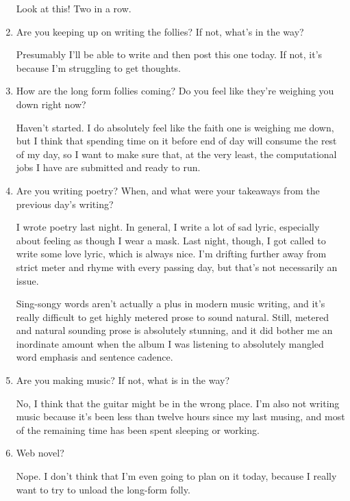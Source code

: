 \documentclass[12pt]{article}
\renewcommand{\,}{\textsuperscript{,}}
\begin{document}
\begin{enumerate}
Look at this! Two in a row.

\item Are you keeping up on writing the follies? If not, what's in the way?

Presumably I'll be able to write and then post this one today. If not, it's because I'm struggling to get thoughts.

\item How are the long form follies coming? Do you feel like they're weighing you down right now?

Haven't started. I do absolutely feel like the faith one is weighing me down, but I think that spending time on it before end of day will consume the rest of my day, so I want to make sure that, at the very least, the computational jobs I have are submitted and ready to run.

\item Are you writing poetry? When, and what were your takeaways from the previous day's writing?

I wrote poetry last night.  
In general, I write a lot of sad lyric, especially about feeling as though I wear a mask.  
Last night, though, I got called to write some love lyric, which is always nice.  
I'm drifting further away from strict meter and rhyme with every passing day, but that's not necessarily an issue.

Sing-songy words aren't actually a plus in modern music writing, and it's really difficult to get highly metered prose to sound natural.  
Still, metered and natural sounding prose is absolutely stunning, and it did bother me an inordinate amount when the album I was listening to absolutely mangled word emphasis and sentence cadence.

\item Are you making music? If not, what is in the way?

No, I think that the guitar might be in the wrong place. I'm also not writing music because it's been less than twelve hours since my last musing, and most of the remaining time has been spent sleeping or working.

\item Web novel?

Nope. I don't think that I'm even going to plan on it today, because I really want to try to unload the long-form folly.

\end{enumerate}
\end{document}
